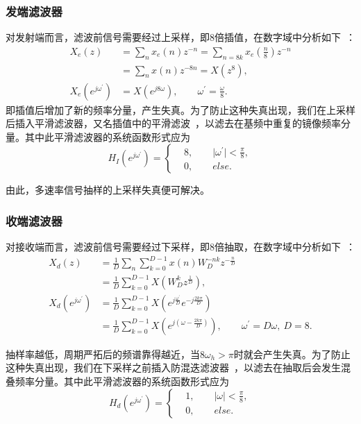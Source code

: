 \documentclass[a4paper,11pt,onecolumn,twoside]{article}
\begin{document}
\subsubsection{发端滤波器}
对发射端而言，滤波前信号需要经过上采样，即8倍插值，在数字域中分析如下~\supercite{course6}：
\begin{equation}
\begin{split}
X_e(z) & = \sum_{n}x_e(n) z^{-n} = \sum_{n = 8k}x_e(\frac{n}{8})z^{-n} \\
& = \sum_{n}x(n)z^{-8n} = X(z^{8}), \\
X_e(e^{j\omega^{'}}) & = X(e^{j8\omega}), \qquad \omega^{'} = \frac{\omega}{8}.
\end{split}
\end{equation}
即插值后增加了新的频率分量，产生失真。为了防止这种失真出现，我们在上采样后插入平滑滤波器，又名插值中的平滑滤波~\supercite{course7}，以滤去在基频中重复的镜像频率分量。其中此平滑滤波器的系统函数形式应为
\begin{equation}
H_I(e^{j\omega^{'}}) =
\left\{
\begin{aligned}
& 8, \qquad \big|\omega^{'}\big| < \frac{\pi}{8}, \\
& 0, \qquad else.
\end{aligned}
\right.
\end{equation}

由此，多速率信号抽样的上采样失真便可解决。

\subsubsection{收端滤波器}
对接收端而言，滤波前信号需要经过下采样，即8倍抽取，在数字域中分析如下~\supercite{course6}：
\begin{equation}
\begin{split}
X_d(z) & = \frac{1}{D} \sum_{n} \sum_{k=0}^{D-1} x(n) W_{D}^{-nk}z^{-\frac{n}{D}} \\
& = \frac{1}{D} \sum_{k=0}^{D-1} X(W_{D}^{k} z^{\frac{1}{D}}), \\
X_d(e^{j\omega^{'}}) & = \frac{1}{D} \sum_{k=0}^{D-1} X(e^{j\frac{\omega^{'}}{D}}e^{-j\frac{2k\pi}{D}}) \\
& = \frac{1}{D} \sum_{k=0}^{D-1} X(e^{j(\omega - \frac{2k\pi}{D})}), \qquad \omega^{'} = D\omega, \ D=8.
\end{split}
\end{equation}

抽样率越低，周期严拓后的频谱靠得越近，当$8\omega_h>\pi$时就会产生失真。为了防止这种失真出现，我们在下采样之前插入防混迭滤波器~\supercite{course7}，以滤去在抽取后会发生混叠频率分量。其中此平滑滤波器的系统函数形式应为
\begin{equation}
H_d(e^{j\omega^{'}}) =
\left\{
\begin{aligned}
& 1, \qquad \big|\omega\big| < \frac{\pi}{8}, \\
& 0, \qquad else.
\end{aligned}
\right.
\end{equation}
\end{document}
